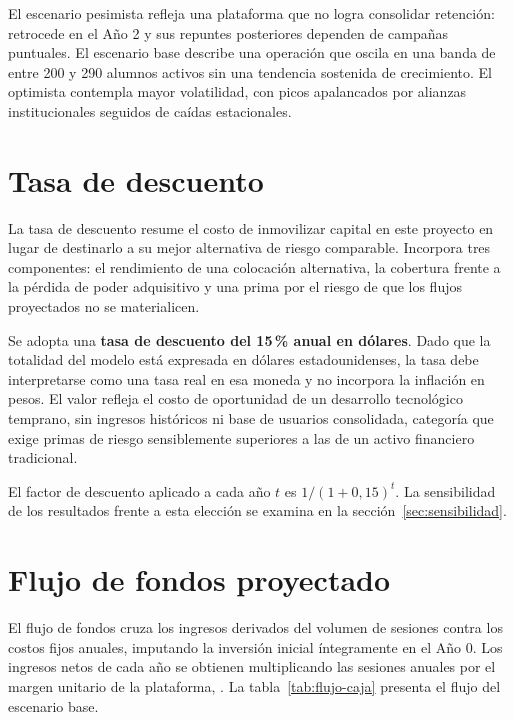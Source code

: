 El escenario pesimista refleja una plataforma que no logra consolidar
retención: retrocede en el Año 2 y sus repuntes posteriores dependen de
campañas puntuales. El escenario base describe una operación que oscila
en una banda de entre 200 y 290 alumnos activos sin una tendencia
sostenida de crecimiento. El optimista contempla mayor volatilidad, con
picos apalancados por alianzas institucionales seguidos de caídas
estacionales.

\section{Tasa de descuento}

La tasa de descuento resume el costo de inmovilizar capital en este
proyecto en lugar de destinarlo a su mejor alternativa de riesgo
comparable. Incorpora tres componentes: el rendimiento de una colocación
alternativa, la cobertura frente a la pérdida de poder adquisitivo y una
prima por el riesgo de que los flujos proyectados no se materialicen.

Se adopta una \textbf{tasa de descuento del 15\,\% anual en dólares}.
Dado que la totalidad del modelo está expresada en dólares
estadounidenses, la tasa debe interpretarse como una tasa real en esa
moneda y no incorpora la inflación en pesos. El valor refleja el costo de
oportunidad de un desarrollo tecnológico temprano, sin ingresos
históricos ni base de usuarios consolidada, categoría que exige primas de
riesgo sensiblemente superiores a las de un activo financiero
tradicional.

El factor de descuento aplicado a cada año $t$ es $1/(1+0{,}15)^t$. La
sensibilidad de los resultados frente a esta elección se examina en la
sección~\ref{sec:sensibilidad}.

\section{Flujo de fondos proyectado}

El flujo de fondos cruza los ingresos derivados del volumen de sesiones
contra los costos fijos anuales, imputando la inversión inicial
íntegramente en el Año 0. Los ingresos netos de cada año se obtienen
multiplicando las sesiones anuales por el margen unitario de la
plataforma, . La tabla~\ref{tab:flujo-caja} presenta el flujo
del escenario base.

